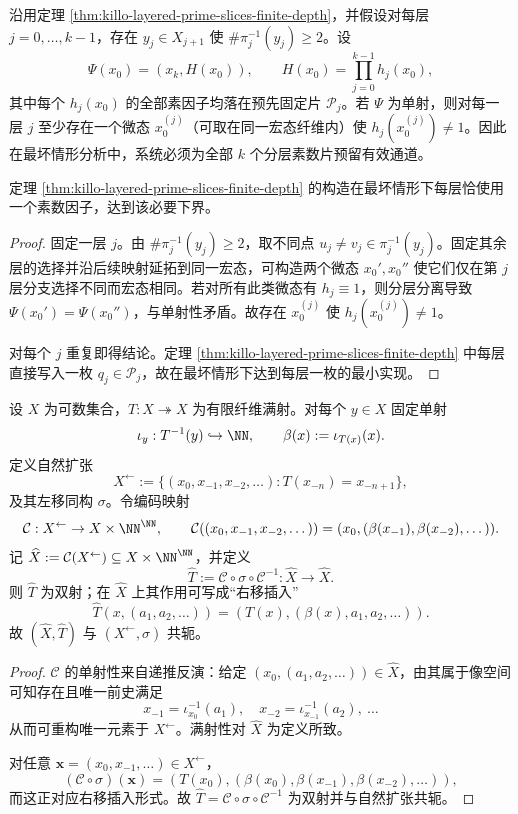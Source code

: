 \begin{corollary}[分层外置的最坏情形必要性与最小实现]\label{cor:killo-layered-necessity-minimality}
沿用定理 \ref{thm:killo-layered-prime-slices-finite-depth}，并假设对每层 \(j=0,\dots,k-1\)，存在 \(y_j\in X_{j+1}\) 使 \(\#\pi_j^{-1}(y_j)\ge 2\)。设
\[
\Psi(x_0)=(x_k,H(x_0)),\qquad
H(x_0)=\prod_{j=0}^{k-1}h_j(x_0),
\]
其中每个 \(h_j(x_0)\) 的全部素因子均落在预先固定片 \(\mathcal P_j\)。若 \(\Psi\) 为单射，则对每一层 \(j\) 至少存在一个微态 \(x_0^{(j)}\)（可取在同一宏态纤维内）使 \(h_j(x_0^{(j)})\neq 1\)。因此在最坏情形分析中，系统必须为全部 \(k\) 个分层素数片预留有效通道。

定理 \ref{thm:killo-layered-prime-slices-finite-depth} 的构造在最坏情形下每层恰使用一个素数因子，达到该必要下界。
\end{corollary}
\begin{proof}
固定一层 \(j\)。由 \(\#\pi_j^{-1}(y_j)\ge 2\)，取不同点 \(u_j\neq v_j\in\pi_j^{-1}(y_j)\)。固定其余层的选择并沿后续映射延拓到同一宏态，可构造两个微态 \(x_0',x_0''\) 使它们仅在第 \(j\) 层分支选择不同而宏态相同。若对所有此类微态有 \(h_j\equiv 1\)，则分层分离导致 \(\Psi(x_0')=\Psi(x_0'')\)，与单射性矛盾。故存在 \(x_0^{(j)}\) 使 \(h_j(x_0^{(j)})\neq 1\)。

对每个 \(j\) 重复即得结论。定理 \ref{thm:killo-layered-prime-slices-finite-depth} 中每层直接写入一枚 \(q_j\in\mathcal P_j\)，故在最坏情形下达到每层一枚的最小实现。
\end{proof}

\begin{theorem}[有限纤维自映射的自然扩张与分支指标寄存器实现]\label{thm:killo-natural-extension-branch-register}
设 \(X\) 为可数集合，\(T:X\twoheadrightarrow X\) 为有限纤维满射。对每个 \(y\in X\) 固定单射
\[
\iota_y:T^{-1}(y)\hookrightarrow\NN,\qquad
\beta(x):=\iota_{T(x)}(x).
\]
定义自然扩张
\[
X^{\leftarrow}:=\{(x_0,x_{-1},x_{-2},\dots):T(x_{-n})=x_{-n+1}\},
\]
及其左移同构 \(\sigma\)。令编码映射
\[
\mathcal C:X^{\leftarrow}\to X\times\NN^\NN,\qquad
\mathcal C((x_0,x_{-1},x_{-2},\dots))=(x_0,(\beta(x_{-1}),\beta(x_{-2}),\dots)).
\]
记 \(\widehat X:=\mathcal C(X^{\leftarrow})\subseteq X\times\NN^\NN\)，并定义
\[
\widehat T:=\mathcal C\circ \sigma\circ \mathcal C^{-1}:\widehat X\to\widehat X.
\]
则 \(\widehat T\) 为双射；在 \(\widehat X\) 上其作用可写成“右移插入”
\[
\widehat T(x,(a_1,a_2,\dots))=(T(x),(\beta(x),a_1,a_2,\dots)).
\]
故 \((\widehat X,\widehat T)\) 与 \((X^{\leftarrow},\sigma)\) 共轭。
\end{theorem}
\begin{proof}
\(\mathcal C\) 的单射性来自递推反演：给定 \((x_0,(a_1,a_2,\dots))\in\widehat X\)，由其属于像空间可知存在且唯一前史满足
\[
x_{-1}=\iota_{x_0}^{-1}(a_1),\quad
x_{-2}=\iota_{x_{-1}}^{-1}(a_2),\ \dots
\]
从而可重构唯一元素于 \(X^{\leftarrow}\)。满射性对 \(\widehat X\) 为定义所致。

对任意 \(\mathbf x=(x_0,x_{-1},\dots)\in X^{\leftarrow}\)，
\[
(\mathcal C\circ \sigma)(\mathbf x)
=(T(x_0),(\beta(x_0),\beta(x_{-1}),\beta(x_{-2}),\dots)),
\]
而这正对应右移插入形式。故 \(\widehat T=\mathcal C\circ\sigma\circ\mathcal C^{-1}\) 为双射并与自然扩张共轭。
\end{proof}

